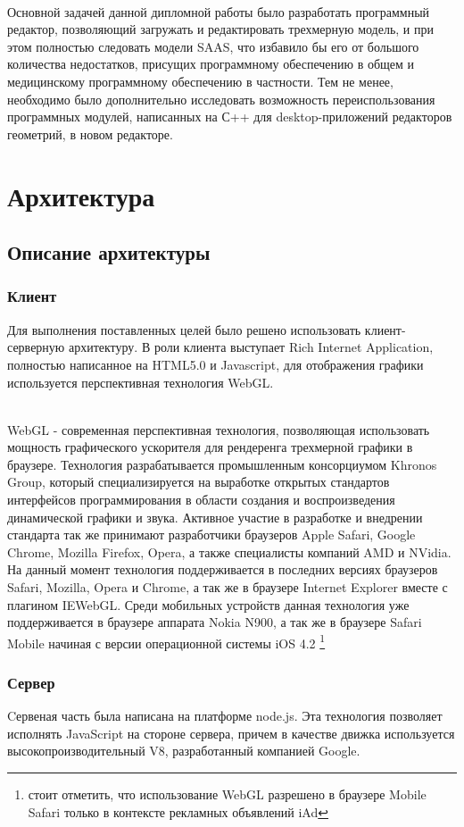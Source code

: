 \documentclass[12pt, a4paper]{article}
\let\stdsection\section
\renewcommand\section{\newpage\stdsection}
\begin{document}
\\
Основной задачей данной дипломной работы было разработать программный редактор,
позволяющий загружать и редактировать трехмерную модель, и при этом полностью
следовать модели SAAS, что избавило бы его от большого количества недостатков,
присущих программному обеспечению в общем и медицинскому программному
обеспечению в частности. Тем не менее, необходимо было дополнительно исследовать
возможность переиспользования программных модулей, написанных на С++ для
desktop-приложений редакторов геометрий, в новом редакторе.

\section{Архитектура}
\subsection{Описание архитектуры}
\subsubsection{Клиент}
Для выполнения поставленных целей было решено использовать клиент-серверную
архитектуру. В роли клиента выступает Rich Internet Application, полностью
написанное на HTML5.0 и Javascript, для отображения графики используется
перспективная технология WebGL.

\\
WebGL - современная перспективная технология, позволяющая использовать мощность
графического ускорителя для рендеренга трехмерной графики в браузере. Технология
разрабатывается промышленным консорциумом Khronos Group, который
специализируется на выработке открытых стандартов интерфейсов программирования в
области создания и воспроизведения динамической графики и звука. Активное
участие в разработке и внедрении стандарта так же принимают разработчики
браузеров Apple Safari, Google Chrome, Mozilla Firefox, Opera,  а также
специалисты компаний AMD и NVidia. На данный момент технология поддерживается в
последних версиях браузеров Safari, Mozilla, Opera и Chrome, а так же в браузере
Internet Explorer вместе с плагином IEWebGL. Среди мобильных устройств данная
технология уже поддерживается в браузере аппарата Nokia N900, а так же в
браузере Safari Mobile начиная с версии операционной системы iOS 4.2
\footnote{стоит отметить, что использование WebGL разрешено в браузере Mobile
Safari только в контексте рекламных объявлений iAd}

\subsubsection{Сервер}
Cервеная часть была написана на платформе node.js. Эта технология позволяет
исполнять JavaScript на стороне сервера, причем в качестве движка используется
высокопроизводительный V8, разработанный компанией Google.
\end{document}
